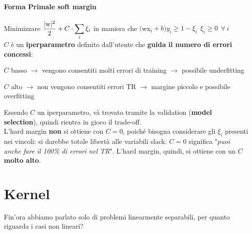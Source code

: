 \documentclass[10pt]{book}
\begin{document}
\paragraph{Forma Primale soft margin} Minimizzare $\mathlarger{\frac{|\text{w}|^2}{2} + C\cdot\sum_i \xi_i}$ in maniera che $($wx$_i + b)y_i \geq 1 - \xi_i\:\:\xi_i \geq 0\:\:\forall\:i$\\
$C$ è un \textbf{iperparametro} definito dall'utente che \textbf{guida il numero di errori concessi}:
\begin{list}{}{}
	\item $C$ basso $\rightarrow$ vengono consentiti molti errori di training $\rightarrow$ possibile underfitting
	\item $C$ alto $\rightarrow$ non vengono consentiti errori TR $\rightarrow$ margine piccolo e possibile overfitting %
\end{list}
Essendo $C$ un iperparametro, và trovato tramite la validation (\textbf{model selection}), quindi rientra in gioco il trade-off.\\
L'hard margin \textbf{non} si ottiene con $C=0$, poiché bisogna considerare gli $\xi_i$ presenti nei vincoli: si darebbe totale libertà alle variabili slack. $C = 0$ significa "\textit{puoi anche fare il 100\% di errori nel TR}". L'hard margin, quindi, si ottiene con un $C$ \textbf{molto alto}.
\section{Kernel}
Fin'ora abbiamo parlato solo di problemi linearmente separabili, per quanto riguarda i casi non lineari?
\end{document}
